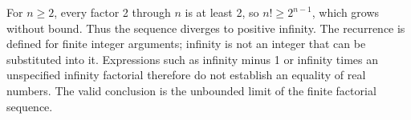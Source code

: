 For $ n\ge2 $, every factor 2 through $ n $ is at least 2, so $ n!\ge2^{n-1}$, which grows without bound. Thus the sequence diverges to positive infinity. The recurrence is defined for finite integer arguments; infinity is not an integer that can be substituted into it. Expressions such as infinity minus 1 or infinity times an unspecified infinity factorial therefore do not establish an equality of real numbers. The valid conclusion is the unbounded limit of the finite factorial sequence.

